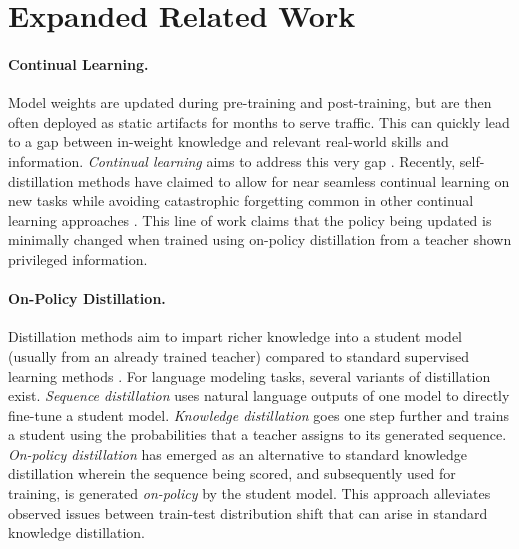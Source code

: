 \section{Expanded Related Work}
\label{app:related-work-continued}

\paragraph{Continual Learning.}
Model weights are updated during pre-training and post-training, but are then often deployed as static artifacts for months to serve traffic. This can quickly lead to a gap between in-weight knowledge and relevant real-world skills and information. \textit{Continual learning} aims to address this very gap \cite{de2021continual, kudithipudi2022biological, hadsell2020embracing, wang2024comprehensive}. Recently, self-distillation methods have claimed to allow for near seamless continual learning on new tasks while avoiding catastrophic forgetting common in other continual learning approaches \cite{shenfeld2026self}. This line of work claims that the policy being updated is minimally changed when trained using on-policy distillation from a teacher shown privileged information.

\paragraph{On-Policy Distillation.}
Distillation methods aim to impart richer knowledge into a student model
(usually from an already trained teacher) compared to standard supervised
learning methods \cite{hinton2015distilling, gou2021knowledge,
agarwal2024policy}. For language modeling tasks, several variants of
distillation exist. \textit{Sequence distillation} uses natural language outputs
of one model to directly fine-tune a student model. \textit{Knowledge
distillation} goes one step further and trains a student using the
probabilities that a teacher assigns to its generated sequence. \textit{On-policy
distillation} has emerged as an alternative to standard knowledge distillation
wherein the sequence being scored, and subsequently used for training, is
generated \textit{on-policy} by the student model. This approach alleviates
observed issues between train-test distribution shift that can arise in standard
knowledge distillation.

